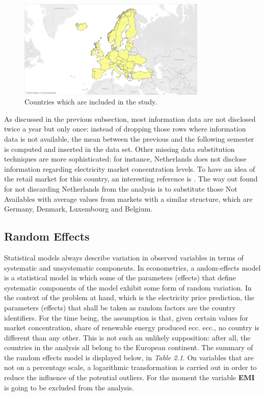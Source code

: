 \documentclass{book}
\begin{document}
\bigskip
\begin{figure}[H]
\begin{center}
\captionsetup{justification=centering}
\includegraphics[width=0.8\textwidth]{Images/cantries.png}
\caption{Countries which are included in the study.}
\end{center}
\end{figure}
\bigskip

As discussed in the previous subsection, most information data are not disclosed twice a year but only once: instead of dropping those rows where information data is not available, the mean between the previous and the following semester is computed and inserted in the data set. Other missing data substitution techniques are more sophisticated: for instance, Netherlands does not disclose information regarding electricity market concentration levels. To have an idea of the retail market for this country, an interesting reference is \cite{mulder2019dutch}.  The way out found for not discarding Netherlands from the analysis is to substitute those Not Availables with average values from markets with a similar structure, which are Germany, Denmark, Luxembourg and Belgium.

\subsection{Random Effects}

Statistical models always describe variation in observed variables in terms of systematic and unsystematic components. In econometrics, a andom-effects model is a statistical model in which some of the parameters (effects) that define systematic components of the model exhibit some form of random variation.\cite{salkind2010encyclopedia} In the context of the problem at hand, which is the electricity price prediction, the parameters (effects) that shall be taken as random factors are the country identifiers. For the time being, the assumption is that, given certain values for market concentration, share of renewable energy produced ecc. ecc., no country is different than any other. This is not such an unlikely supposition: after all, the countries in the analysis all belong to the European continent. The summary of the random effects model is displayed below, in \textit{Table 2.1}. On variables that are not on a percentage scale, a logarithmic transformation is carried out in order to reduce the influence of the potential outliers. For the moment the variable \textbf{EMI} is going to be excluded from the analysis.
\end{document}
